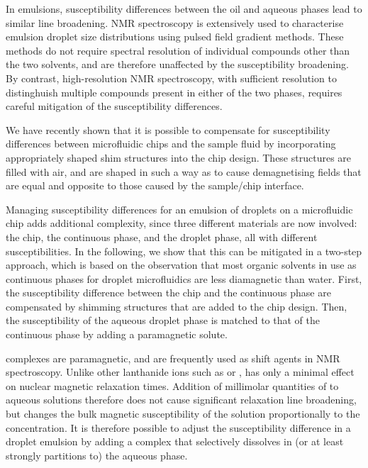 In emulsions, susceptibility differences between the oil and aqueous phases
lead to similar line broadening.\cite{Kuchel:2003ip} NMR spectroscopy is extensively
used to characterise emulsion droplet size distributions using pulsed
field gradient methods.\cite{VANDENENDEN:1990ck,FOUREL:1994jv,
Hollingsworth:2004iy,Hindmarsh:2005en,Johns:2009ib,Bernewitz:2011km,Lingwood:2012je}
These methods do not require spectral resolution of individual
compounds other than the two solvents, and are therefore
unaffected by the susceptibility broadening. By contrast, high-resolution
NMR spectroscopy, with sufficient resolution to distinghuish multiple
compounds present in either of the two phases,
requires careful mitigation of the susceptibility
differences.

We have recently shown that it is possible to compensate for
susceptibility differences between microfluidic chips and the sample
fluid by incorporating appropriately shaped shim structures
into the chip design.\cite{Ryan:2014hl} These structures are filled with air,
and are shaped in such a way as to cause demagnetising fields
that are equal and opposite to those caused by the sample/chip interface.


Managing susceptibility differences for an emulsion of droplets on a
microfluidic chip adds additional complexity, since three different materials
are now involved: the chip, the continuous phase, and the droplet phase,
all with different susceptibilities.
In the following, we show that this can be mitigated in a two-step approach,
which is based on the observation that most organic solvents in use
as continuous phases for droplet microfluidics are less diamagnetic than
water.
First, the susceptibility difference between the chip and the continuous phase
are compensated by shimming structures that are added to the
chip design. Then, the susceptibility of the aqueous droplet phase is matched
to that of the continuous phase by adding a paramagnetic solute.

 complexes are paramagnetic, and are frequently used as
shift agents in NMR spectroscopy. Unlike other lanthanide ions such
as  or ,  has only a minimal
effect on nuclear magnetic relaxation times.\cite{Peters:1996bj} Addition of
millimolar quantities of  to aqueous solutions
therefore does not cause significant relaxation line broadening, but changes
the bulk magnetic susceptibility of the solution proportionally
to the  concentration. It is therefore possible
to adjust the susceptibility difference in a droplet emulsion
by adding a  complex that selectively dissolves in (or at least
strongly partitions to) the aqueous phase.


